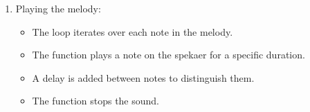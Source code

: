 \documentclass[a4paper,11pt,english]{sphinxmanual}
\begin{document}
\begin{enumerate}
\begin{sphinxVerbatim}[commandchars=\\\{\}]
\PYG{p}{[}\PYG{p}{]}
\PYG{p}{[}\PYG{p}{]}
\end{sphinxVerbatim}

\item {} 
\sphinxAtStartPar
Playing the melody:
\begin{itemize}
\item {} 
\sphinxAtStartPar
The  loop iterates over each note in the melody.

\item {} 
\sphinxAtStartPar
The  function plays a note on the spekaer for a specific duration.

\item {} 
\sphinxAtStartPar
A delay is added between notes to distinguish them.

\item {} 
\sphinxAtStartPar
The  function stops the sound.

\end{itemize}


\end{enumerate}
\end{document}
